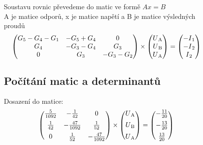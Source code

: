 \begin{figure}[H]
Soustavu rovnic převedeme do matic ve formě $Ax = B$ \\
A je matice odporů, x je matice napětí a B je matice výsledných proudů
\begin{align*}
    \begin{pmatrix}
    G\textsubscript{5}-G\textsubscript{4}-G\textsubscript{1}&-G\textsubscript{5}+G\textsubscript{4}&0 \\
    G\textsubscript{4}&-G\textsubscript{3}-G\textsubscript{4}&G\textsubscript{3} \\
    0&G\textsubscript{3}&-G\textsubscript{3}-G\textsubscript{2}
    \end{pmatrix}\times
    \begin{pmatrix}
    U\textsubscript{A} \\
    U\textsubscript{B} \\
    U\textsubscript{A}
    \end{pmatrix} = 
    \begin{pmatrix}
    -I\textsubscript{1} \\
    -I\textsubscript{2} \\
    I\textsubscript{2}
    \end{pmatrix}
\end{align*}
\subsection{Počítání matic a determinantů}
Dosazení do matice:
\begin{align*}
    \begin{pmatrix}
    \frac{5}{1092}&-\frac{1}{42}&0 \\[5pt]
    \frac{1}{42}&-\frac{47}{1092}&\frac{1}{52} \\[5pt]
    0&\frac{1}{52}&-\frac{47}{1092}
    \end{pmatrix}\times
    \begin{pmatrix}
    U\textsubscript{A} \\[5pt]
    U\textsubscript{B} \\[5pt]
    U\textsubscript{A}
    \end{pmatrix} = 
    \begin{pmatrix}
    -\frac{11}{20} \\[5pt]
    -\frac{13}{20} \\[5pt]
    \frac{13}{20}
    \end{pmatrix}
\end{align*}
\end{figure}


